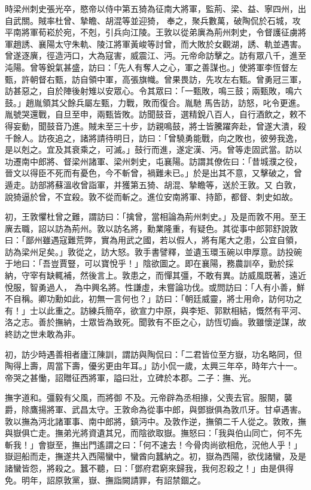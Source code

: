 \begin{pinyinscope}
 時梁州刺史張光卒，愍帝以侍中第五猗為征南大將軍，監荊、梁、益、寧四州，出自武關。賊率杜曾、摯瞻、胡混等並迎猗，
 奉之，聚兵數萬，破陶侃於石城，攻平南將軍荀崧於宛，不剋，引兵向江陵。王敦以從弟廙為荊州刺史，令督護征虜將軍趙誘、襄陽太守朱軌、陵江將軍黃峻等討曾，而大敗於女觀湖，誘、軌並遇害。曾遂逐廙，徑造沔口，大為寇害，威震江、沔。元帝命訪擊之。訪有眾八千，進至沌陽。曾等銳氣甚盛，訪曰：「先人有奪人之心，軍之善謀也。」使將軍李恆督左甄，許朝督右甄，訪自領中軍，高張旗幟。曾果畏訪，先攻左右甄。曾勇冠三軍，訪甚惡之，自於陣後射雉以安眾心。令其眾曰：「一甄敗，鳴三鼓；兩甄敗，鳴六鼓。」趙胤領其父餘兵屬左甄，力戰，敗而復合。胤馳
 馬告訪，訪怒，叱令更進。胤號哭還戰，自旦至申，兩甄皆敗。訪聞鼓音，選精銳八百人，自行酒飲之，敕不得妄動，聞鼓音乃進。賊未至三十步，訪親鳴鼓，將士皆騰躍奔赴，曾遂大潰，殺千餘人。訪夜追之，諸將請待明日，訪曰：「曾驍勇能戰，向之敗也，彼勞我逸，是以剋之。宜及其衰乘之，可滅。」鼓行而進，遂定漢、沔。曾等走固武當。訪以功遷南中郎將、督梁州諸軍、梁州刺史，屯襄陽。訪謂其僚佐曰：「昔城濮之役，晉文以得臣不死而有憂色，今不斬曾，禍難未已。」於是出其不意，又擊破之，曾遁走。訪部將蘇溫收曾詣軍，并獲第五猗、胡混、摯瞻等，送於王敦。又
 白敦，說猗逼於曾，不宜殺。敦不從而斬之。進位安南將軍、持節，都督、刺史如故。



 初，王敦懼杜曾之難，謂訪曰：「擒曾，當相論為荊州刺史。」及是而敦不用。至王廙去職，詔以訪為荊州。敦以訪名將，勳業隆重，有疑色。其從事中郎郭舒說敦曰：「鄙州雖遇寇難荒弊，實為用武之國，若以假人，將有尾大之患，公宜自領，訪為梁州足矣。」敦從之，訪大怒。敦手書譬釋，並遺玉環玉碗以申厚意。訪投碗于地曰：「吾豈賈豎，可以寶悅乎！」陰欲圖之。即在襄陽，務農訓卒，勤於採納，守宰有缺輒補，然後言上。敦患之，而憚其彊，不敢有異。訪威風既著，遠近悅服，智勇過人，
 為中興名將。性謙虛，未嘗論功伐。或問訪曰：「人有小善，鮮不自稱。卿功勳如此，初無一言何也？」訪曰：「朝廷威靈，將士用命，訪何功之有！」士以此重之。訪練兵簡卒，欲宣力中原，與李矩、郭默相結，慨然有平河、洛之志。善於撫納，士眾皆為致死。聞敦有不臣之心，訪恆切齒。敦雖懷逆謀，故終訪之世未敢為非。



 初，訪少時遇善相者廬江陳訓，謂訪與陶侃曰：「二君皆位至方嶽，功名略同，但陶得上壽，周當下壽，優劣更由年耳。」訪小侃一歲，太興三年卒，時年六十一。帝哭之甚慟，詔贈征西將軍，謚曰壯，立碑於本郡。二子：撫、光。



 撫字道和。彊毅有父風，而將御
 不及。元帝辟為丞相掾，父喪去官。服闋，襲爵，除鷹揚將軍、武昌太守。王敦命為從事中郎，與鄧嶽俱為敦爪牙。甘卓遇害。敦以撫為沔北諸軍事、南中郎將，鎮沔中。及敦作逆，撫領二千人從之。敦敗，撫與嶽俱亡走。撫弟光將資遺其兄，而陰欲取嶽。撫怒曰：「我與伯山同亡，何不先斬我！」會嶽至，撫出門遙謂之曰：「何不速去！今骨肉尚欲相危，況他人乎！」嶽迴船而走，撫遂共入西陽蠻中，蠻酋向蠶納之。初，嶽為西陽，欲伐諸蠻，及是諸蠻皆怨，將殺之。蠶不聽，曰：「鄧府君窮來歸我，我何忍殺之！」由是俱得免。明年，詔原敦黨，嶽、撫詣闕請罪，有詔禁錮之。




\end{pinyinscope}
